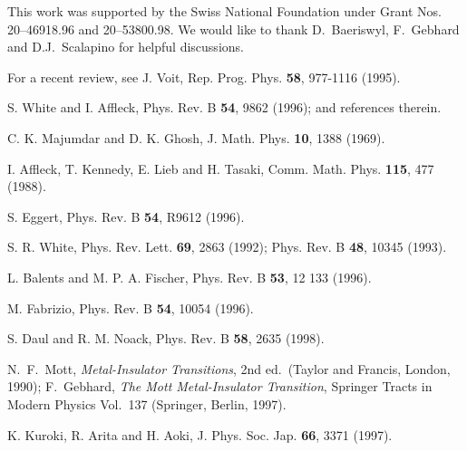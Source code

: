 This work was supported by the Swiss National Foundation under Grant
Nos. 20--46918.96 and 20--53800.98.
We would like to thank D.\ Baeriswyl, F.\ Gebhard and D.J.\ Scalapino
for helpful discussions.


\begin{thebibliography}{99}

 For a recent review, see J. Voit, Rep. Prog. Phys.
{\bf 58}, 977-1116 (1995).

 S. White and I. Affleck, Phys. Rev. B {\bf 54}, 
9862 (1996); and references therein.

 C. K. Majumdar and D. K. Ghosh,
J. Math. Phys. {\bf 10}, 1388 (1969).

 I. Affleck, T. Kennedy, E. Lieb and H. Tasaki, Comm.
Math. Phys. {\bf 115}, 477 (1988). 

 S. Eggert, Phys. Rev. B {\bf 54}, R9612 (1996).

 S. R. White, Phys. Rev. Lett. {\bf 69}, 2863 (1992);
Phys. Rev. B {\bf 48}, 10345 (1993).

 L. Balents and M. P. A. Fischer, Phys. Rev. B 
{\bf 53}, 12 133 (1996).

 M. Fabrizio, Phys. Rev. B {\bf 54}, 10054 (1996).

 S. Daul and R. M. Noack, Phys. Rev. B {\bf 58},
2635 (1998). 

 N.~F.~Mott, {\sl Metal-Insulator Transitions}, 
2nd ed.\ (Taylor and Francis, London, 1990);
F.~Gebhard, {\sl The Mott Metal-Insulator Transition}, 
Springer Tracts in Modern Physics Vol.~137 (Springer, Berlin, 1997).


 K. Kuroki, R. Arita and H. Aoki, J. Phys. Soc. Jap. 
{\bf 66}, 3371 (1997).

\end{thebibliography}



